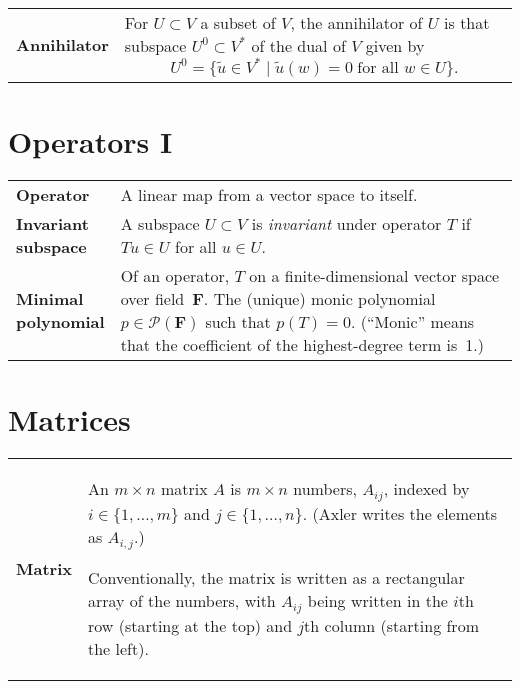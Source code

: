 \documentclass[10pt, a4paper, landscape]{article}
\newcommand{\defn}[1]{\textbf{#1}}
\newlength{\termheaderwd}
\begin{document}
\begin{multicols*}{3}
\begin{tabularx}{\columnwidth}{@{}l>{\raggedright\arraybackslash}X@{}}
  \defn{Annihilator} & For $U\subset V$ a subset of $V$, the annihilator of $U$ is that subspace $U^0\subset V^*$ of the dual of $V$ given by
                       \[
                       U^0 = \{ \tilde{u}\in V^* \mid \tilde{u}(w)=0 \;\text{for all $w\in U$} \}.
                       \]
\end{tabularx}

  
\section*{Operators I}
\begin{tabularx}{\columnwidth}{@{}l>{\raggedright\arraybackslash}X@{}}
  \toprule
  \defn{Operator} & A linear map from a vector space to itself. \\

 \settowidth{\termheaderwd}{polynomial}%
 \parbox[t]{\termheaderwd}{\defn{Invariant\\ subspace}} & A subspace $U \subset V$ is \emph{invariant} under operator $T$ if $T u\in U$ for all $u\in U$. \\

  \parbox[t]{\termheaderwd}{\defn{Minimal\\ polynomial}} & Of an operator, $T$ on a finite-dimensional vector space over field~$\mathbold{F}$. The (unique) monic polynomial $p\in\mathcal{P}(\mathbold{F})$ such that $p(T)=0$. (``Monic'' means that the coefficient of the highest-degree term is~1.)  \\
  
\end{tabularx}


\section*{Matrices}
\begin{tabularx}{\columnwidth}{@{}l>{\raggedright\arraybackslash}X@{}}
  \toprule
  \defn{Matrix} & An $m\times n$ matrix $A$ is $m\times n$ numbers, $A_{ij}$, indexed by $i\in\{1,\dotsc, m\}$ and $j\in\{1,\dotsc, n\}$. (Axler writes the elements as $A_{i,j}$.)

  Conventionally, the matrix is written as a rectangular array of the
  numbers, with $A_{ij}$ being written in the $i$th row (starting at the
  top) and $j$th column (starting from the left).
  

\end{tabularx}
\end{multicols*}
\end{document}
